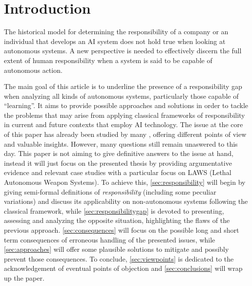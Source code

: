 \section{Introduction}\label{sec:introduction}

The historical model for determining the responsibility of a company or an individual that develops an AI system does not hold true when looking at autonomous systems.
A new perspective is needed to effectively discern the full extent of human responsibility when a system is said to be capable of autonomous action.

The main goal of this article is to underline the presence of a responsibility gap \parencite{MATTRG} when analyzing all kinds of autonomous systems, particularly those capable of ``learning''.
It aims to provide possible approaches and solutions in order to tackle the problems that may arise from applying classical frameworks of responsibility in current and future contexts that employ AI technology.
The issue at the core of this paper has already been studied by many \parencite{MATTRG, SANFRG, COEAIR, NOVAIA}, offering different points of view and valuable insights.
However, many questions still remain unaswered to this day.
This paper is not aiming to give definitive answers to the issue at hand, instead it will just focus on the presented thesis by providing argumentative evidence and relevant case studies with a particular focus on LAWS (Lethal Autonomous Weapon Systems).
To achieve this, \autoref{sec:responsibility} will begin by giving semi-formal definitions of \textit{responsibility} (including some peculiar variations) and discuss its applicability on non-autonomous systems following the classical framework, while \autoref{sec:responsibilitygap} is devoted to presenting, assessing and analyzing the opposite situation, highlighting the flaws of the previous approach.
\autoref{sec:consequences} will focus on the possible long and short term consequences of erroneous handling of the presented issues, while \autoref{sec:approaches} will offer some plausible solutions to mitigate and possibly prevent those consequences.
To conclude, \autoref{sec:viewpoints} is dedicated to the acknowledgement of eventual points of objection and \autoref{sec:conclusions} will wrap up the paper.